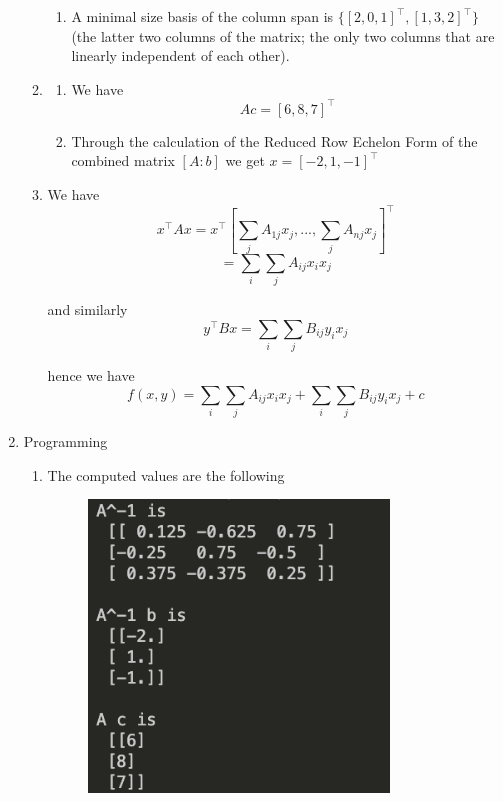 \documentclass[submit]{harvardml}
\begin{document}
\begin{enumerate}
\begin{enumerate}
\begin{enumerate}
    \item
    A minimal size basis of the column span is $\{[2,0,1]^\top, [1,3,2]^\top\}$ (the latter two 
    columns of the matrix; the only two columns that are linearly independent of each other).  
  \end{enumerate}

  \item
  \begin{enumerate}
    \item
    We have $$Ac = [6,8,7]^\top$$
    
    \item
    Through the calculation of the Reduced Row Echelon Form of the combined matrix $[ A : b ]$ we 
    get $x = [-2,1,-1]^\top$
  \end{enumerate}

  \item
  We have 
  $$x^\top A x = x^\top \left[\sum_j A_{1j} x_j, ..., \sum_j A_{nj} x_j \right]^\top$$
  $$= \sum_i \sum_j A_{ij} x_i x_j$$

  and similarly 
  $$y^\top B x = \sum_i \sum_j B_{ij} y_i x_j$$

  hence we have
  $$\boxed{f(x,y) = \sum_i \sum_j A_{ij} x_i x_j + \sum_i \sum_j B_{ij} y_i x_j + c}$$
\end{enumerate}

\item Programming
\begin{enumerate}
  \item
  The computed values are the following
  \begin{figure}[h]
  \includegraphics[width=8cm]{ps0_6_1}
  \centering
  \end{figure}


\end{enumerate}
\end{enumerate}
\end{document}
